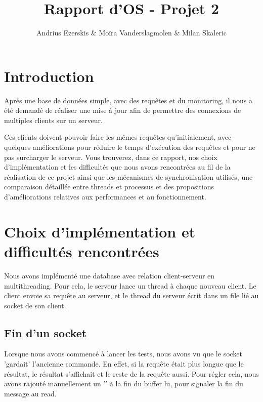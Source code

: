 \documentclass[utf8]{article}
\begin{document}
\begin{titlepage}


\author{Andrius Ezerskis \& Moïra Vanderslagmolen \& Milan Skaleric}
\title{Rapport d'OS - Projet 2}

\maketitle
\end{titlepage}
\begin{large}

\section{Introduction}
\par
\indent

Après une base de données simple, avec des requêtes et du monitoring, il nous a
été demandé de réaliser une mise à jour afin de permettre des connexions de
multiples clients sur un serveur.

\par
\par

Ces clients doivent pouvoir faire les mêmes requêtes qu'initialement, avec
quelques améliorations pour réduire le temps d'exécution des requêtes et pour ne
pas surcharger le serveur. Vous trouverez, dans ce rapport, nos choix
d'implémentation et les difficultés que nous avons rencontrées au fil de la
réalisation de ce projet ainsi que les mécanismes de synchronisation utilisés,
une comparaison détaillée entre threads et processus et des propositions
d'améliorations relatives aux performances et au fonctionnement.

\par
\section{Choix d'implémentation et difficultés rencontrées}
Nous avons implémenté une database avec relation client-serveur en
multithreading. Pour cela, le serveur lance un thread à chaque nouveau client.
Le client envoie sa requête au serveur, et le thread du serveur écrit dans un file lié au
socket de son client.   
\subsection{Fin d'un socket}
\par
\indent

Lorsque nous avons commencé à lancer les tests, nous avons vu que le socket
'gardait' l'ancienne commande. En effet, si la requête était plus longue que le
résultat, le résultat s'affichait et le reste de la requête aussi. Pour régler
cela, nous avons rajouté manuellement un '' à la fin du buffer lu, pour
signaler la fin du message au read.   


\end{large}
\end{document}
